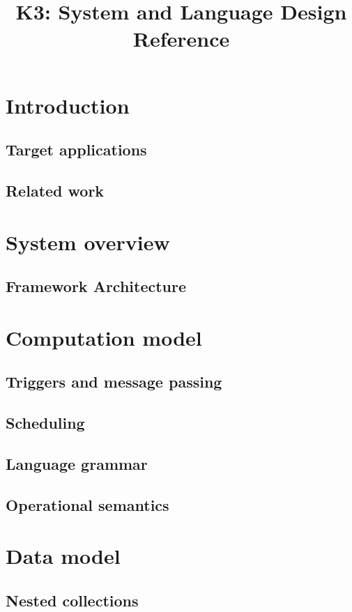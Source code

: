 \documentclass[10pt]{article}
\title{K3: System and Language Design Reference}
\author{}
\date{}
\begin{document}
\maketitle

\tableofcontents

\todototoc
\listoftodos

\section{Introduction}
  \subsection{Target applications}
  \subsection{Related work}

\section{System overview}
  \subsection{Framework Architecture}

\section{Computation model}
  \subsection{Triggers and message passing}
  \subsection{Scheduling}
  \subsection{Language grammar}
  \subsection{Operational semantics}

\section{Data model}
  \subsection{Nested collections}
\end{document}
